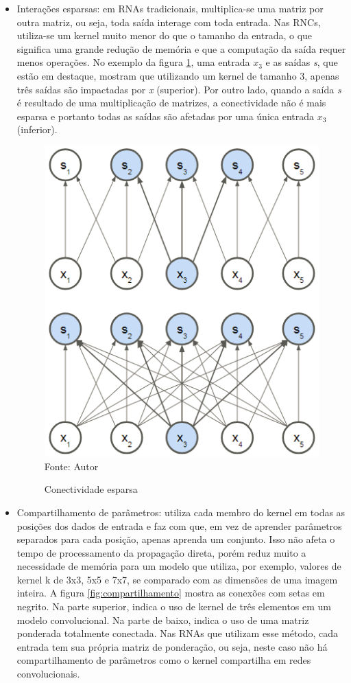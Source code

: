 \documentclass[
	12pt,				%
    oneside,			%
	a4paper,			%
	english,			%
	french,				%
	spanish,			%
	brazil,				%
	]{abntex2}
\begin{document}
\begin{itemize}
    \item Interações esparsas: em RNAs tradicionais, multiplica-se uma matriz por outra matriz, ou seja, toda saída interage com toda entrada. Nas RNCs, utiliza-se um kernel muito menor do que o tamanho da entrada, o que significa uma grande redução de memória e que a computação da saída requer menos operações. No exemplo da figura \ref{fig:esparso}, uma entrada \textit{$x_3$} e as saídas \textit{s}, que estão em destaque, mostram que utilizando um kernel de tamanho 3, apenas três saídas são impactadas por \textit{x} (superior). Por outro lado, quando a saída \textit{s} é resultado de uma multiplicação de matrizes, a conectividade não é mais esparsa e portanto todas as saídas são afetadas por uma única entrada \textit{$x_3$} (inferior).
    
\begin{figure}[H]
    \centering
    \caption{Conectividade esparsa}
    \includegraphics[scale=1]{esparso1}\\
    Fonte: Autor\hfill
    \label{fig:esparso}
\end{figure}
    
        \item Compartilhamento de parâmetros: utiliza cada membro do kernel em todas as posições dos dados de entrada e faz com que, em vez de aprender parâmetros separados para cada posição, apenas aprenda um conjunto. Isso não afeta o tempo de processamento da propagação direta, porém reduz muito a necessidade de memória para um modelo que utiliza, por exemplo, valores de kernel k de 3x3, 5x5 e 7x7, se comparado com as dimensões de uma imagem inteira. A figura \ref{fig:compartilhamento} mostra as conexões com setas em negrito. Na parte superior, indica o uso de kernel de três elementos em um modelo convolucional. Na parte de baixo, indica o uso de uma matriz ponderada totalmente conectada. Nas RNAs que utilizam esse método, cada entrada tem sua própria matriz de ponderação, ou seja, neste caso não há compartilhamento de parâmetros como o kernel compartilha em redes convolucionais.
 

\end{itemize}
\end{document}
